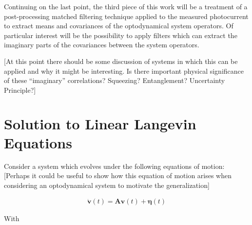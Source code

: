 \documentclass[12pt]{article}
\newcommand{\bv}[1]{\boldsymbol{#1}}
\begin{document}
Continuing on the last point, the third piece of this work will be a treatment of a post-processing matched filtering technique applied to the measured photocurrent to extract means and covariances of the optodynamical system operators. Of particular interest will be the possibility to apply filters which can extract the imaginary parts of the covariances between the system operators.

[At this point there should be some discussion of systems in which this can be applied and why it might be interesting. Is there important physical significance of these ``imaginary'' correlations? Squeezing? Entanglement? Uncertainty Principle?]

\section{Solution to Linear Langevin Equations}
Consider a system which evolves under the following equations of motion: [Perhaps it could be useful to show how this equation of motion arises when considering an optodynamical system to motivate the generalization]

\begin{align}
\dot{\bv{v}}(t) = \bv{A}\bv{v}(t) + \bv{\eta}(t)
\end{align}

With
\end{document}
